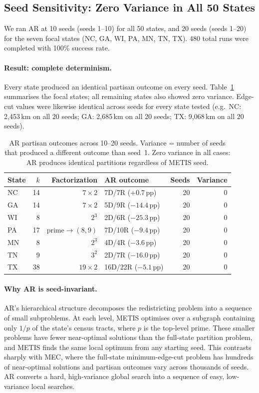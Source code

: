 \subsection{Seed Sensitivity: Zero Variance in All 50 States}
\label{sec:eval:seeds}

We ran AR at 10 seeds (seeds 1--10) for all 50 states, and 20 seeds
(seeds 1--20) for the seven focal states (NC, GA, WI, PA, MN, TN, TX).
480 total runs were completed with 100\% success rate.

\paragraph{Result: complete determinism.}
Every state produced an identical partisan outcome on every seed.
Table~\ref{tab:seed-sensitivity} summarises the focal states; all remaining
states also showed zero variance. Edge-cut values were likewise identical
across seeds for every state tested (e.g.\ NC: 2{,}453\,km on all 20 seeds;
GA: 2{,}685\,km on all 20 seeds; TX: 9{,}068\,km on all 20 seeds).

\begin{table}[h]
\centering\small
\begin{tabular}{lrrlrr}
\toprule
State & $k$ & Factorization & AR outcome & Seeds & Variance \\
\midrule
NC & 14 & $7 \times 2$ & 7D/7R ($+0.7$\,pp) & 20 & 0 \\
GA & 14 & $7 \times 2$ & 5D/9R ($-14.4$\,pp) & 20 & 0 \\
WI & 8  & $2^3$        & 2D/6R ($-25.3$\,pp) & 20 & 0 \\
PA & 17 & prime$\to(8{,}9)$ & 7D/10R ($-9.4$\,pp) & 20 & 0 \\
MN & 8  & $2^3$        & 4D/4R ($-3.6$\,pp)  & 20 & 0 \\
TN & 9  & $3^2$        & 2D/7R ($-16.0$\,pp) & 20 & 0 \\
TX & 38 & $19 \times 2$ & 16D/22R ($-5.1$\,pp) & 20 & 0 \\
\bottomrule
\end{tabular}
\caption{AR partisan outcomes across 10--20 seeds. Variance = number of seeds
  that produced a different outcome than seed~1. Zero variance in all cases:
  AR produces identical partitions regardless of METIS seed.}
\label{tab:seed-sensitivity}
\end{table}

\paragraph{Why AR is seed-invariant.}
AR's hierarchical structure decomposes the redistricting problem into a
sequence of small subproblems. At each level, METIS optimises over a
subgraph containing only $1/p$ of the state's census tracts, where $p$ is the
top-level prime. These smaller problems have fewer near-optimal solutions than
the full-state partition problem, and METIS finds the same local optimum from
any starting seed. This contrasts sharply with MEC, where the full-state
minimum-edge-cut problem has hundreds of near-optimal solutions and partisan
outcomes vary across thousands of seeds. AR converts a hard, high-variance
global search into a sequence of easy, low-variance local searches.

